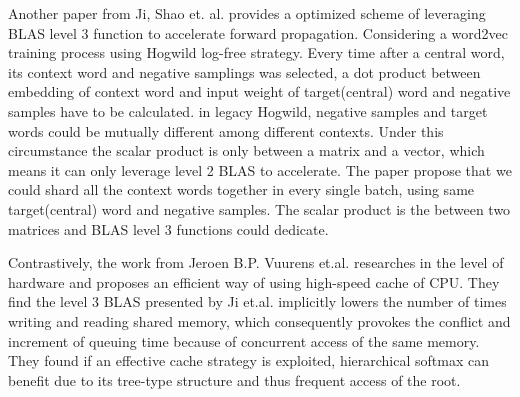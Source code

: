 Another paper from Ji, Shao et. al. \cite{ji2016parallelizing} provides a optimized scheme of leveraging BLAS level 3 function to accelerate forward propagation. Considering a word2vec training process using Hogwild \cite{recht2011hogwild} log-free strategy. Every time after a central word, its context word and negative samplings was selected, a dot product between embedding of context word and input weight of target(central) word and negative samples have to be calculated. in legacy Hogwild, negative samples and target words could be mutually different among different contexts. Under this circumstance the scalar product is only between a matrix and a vector, which means it can only leverage level 2 BLAS to accelerate. The paper propose that we could shard all the context words together in every single batch, using same target(central) word and negative samples. The scalar product is the between two matrices and BLAS level 3 functions could dedicate.

Contrastively, the work from Jeroen B.P. Vuurens et.al. \cite{eickhoff2016efficient} researches in the level of hardware and proposes an efficient way of using high-speed cache of CPU. They find the level 3 BLAS presented by Ji et.al. implicitly lowers the number of times writing and reading shared memory, which consequently provokes the conflict and increment of queuing time because of concurrent access of the same memory. They found if an effective cache strategy is exploited, hierarchical softmax can benefit due to its tree-type structure and  thus frequent access of the root.
